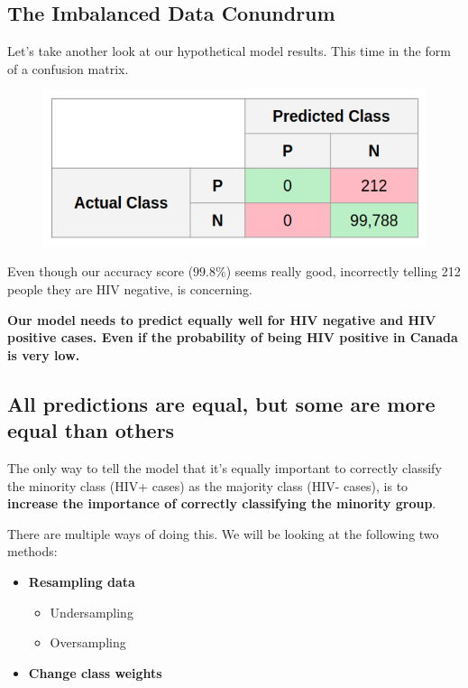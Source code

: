 \documentclass[11pt]{article}
\makeatletter
\def\maxwidth{\ifdim\Gin@nat@width>\linewidth\linewidth
    \else\Gin@nat@width\fi}
\let\Oldincludegraphics\includegraphics
\renewcommand{\includegraphics}[1]{\Oldincludegraphics[width=.8\maxwidth]{#1}}
\providecommand{\tightlist}{%
      \setlength{\itemsep}{0pt}\setlength{\parskip}{0pt}}
\makeatother
\begin{document}
    \subsection{The Imbalanced Data
Conundrum}\label{the-imbalanced-data-conundrum}

Let's take another look at our hypothetical model results. This time in
the form of a confusion matrix.

\begin{figure}
\centering
\includegraphics{../data/img/unbalanced_confusion.png}
\caption{}
\end{figure}

Even though our accuracy score (\(99.8\%\)) seems really good,
incorrectly telling 212 people they are HIV negative, is concerning.

\textbf{Our model needs to predict equally well for HIV negative and HIV
positive cases. Even if the probability of being HIV positive in Canada
is very low.}

\subsection{All predictions are equal, but some are more equal than
others}\label{all-predictions-are-equal-but-some-are-more-equal-than-others}

The only way to tell the model that it's equally important to correctly
classify the minority class (HIV+ cases) as the majority class (HIV-
cases), is to \textbf{increase the importance of correctly classifying
the minority group}.

There are multiple ways of doing this. We will be looking at the
following two methods:

\begin{itemize}
\tightlist
\item
  \textbf{Resampling data}

  \begin{itemize}
  \tightlist
  \item
    Undersampling
  \item
    Oversampling
  \end{itemize}
\item
  \textbf{Change class weights}
\end{itemize}
\end{document}
